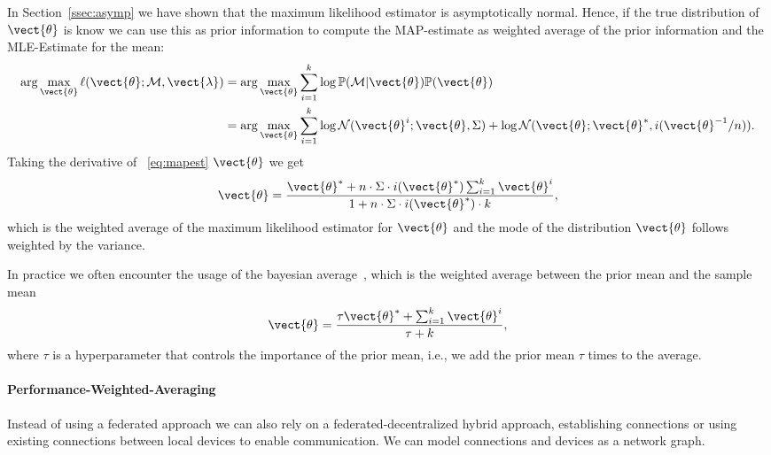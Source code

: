 In Section~\ref{ssec:asymp} we have shown that the maximum likelihood estimator is asymptotically normal.
Hence, if the true distribution of $\vect{\theta}$ is know we can use this as prior information to compute the MAP-estimate as weighted average of the prior information and the MLE-Estimate for the mean:
\begin{equation}
    \label{eq:mapest}
    \begin{split}
    \arg\max_{\vect{\theta}} \ell(\vect{\theta}; \mathcal{M}, \vect{\lambda}) &= \arg\max_{\vect{\theta}} \sum_{i=1}^k \log \mathbb{P}(\mathcal{M}\lvert \vect{\theta}) \mathbb{P}(\vect{\theta}) \\
    &= \arg\max_{\vect{\theta}} \sum_{i=1}^k \log \mathcal{N}(\vect{\theta}^i ; \vect{\theta}, \Sigma) + \log \mathcal{N}(\vect{\theta}; \vect{\theta}^*, i(\vect{\theta}^{-1}/n)).
    \end{split}
\end{equation}
Taking the derivative of \eq~\ref{eq:mapest} \wrt $\vect{\theta}$ we get
\begin{equation}
    \vect{\theta} = \frac{\vect{\theta}^*  + n \cdot \Sigma \cdot i(\vect{\theta}^*) \sum_{i=1}^k \vect{\theta}^i}{1 + n \cdot \Sigma \cdot i(\vect{\theta}^*) \cdot k},
\end{equation}
which is the weighted average of the maximum likelihood estimator for $\vect{\theta}$ and the mode of the distribution $\vect{\theta}$ follows weighted by the variance.

In practice we often encounter the usage of the bayesian average~\cite{de2011bayesian}, which is the weighted average between the prior mean and the sample mean
\begin{equation}
    \vect{\theta} = \frac{\tau \vect{\theta}^* + \sum_{i=1}^k \vect{\theta}^i}{\tau + k},
\end{equation}
where $\tau$ is a hyperparameter that controls the importance of the prior mean, i.e., we add the prior mean $\tau$ times to the average. 

\paragraph*{Performance-Weighted-Averaging}

Instead of using a federated approach we can also rely on a federated-decentralized hybrid approach, establishing connections or using existing connections between local devices to enable communication.
We can model connections and devices as a network graph.

